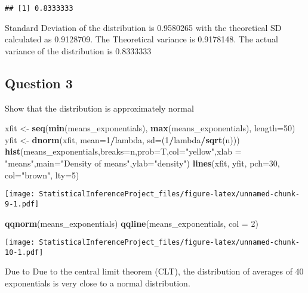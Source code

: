\documentclass[
]{article}
\newenvironment{Shaded}{\begin{snugshade}}{\end{snugshade}}
\newcommand{\AttributeTok}[1]{\textcolor[rgb]{0.13,0.29,0.53}{#1}}
\newcommand{\DecValTok}[1]{\textcolor[rgb]{0.00,0.00,0.81}{#1}}
\newcommand{\FunctionTok}[1]{\textcolor[rgb]{0.13,0.29,0.53}{\textbf{#1}}}
\newcommand{\NormalTok}[1]{#1}
\newcommand{\OtherTok}[1]{\textcolor[rgb]{0.56,0.35,0.01}{#1}}
\newcommand{\SpecialCharTok}[1]{\textcolor[rgb]{0.81,0.36,0.00}{\textbf{#1}}}
\newcommand{\StringTok}[1]{\textcolor[rgb]{0.31,0.60,0.02}{#1}}
\begin{document}
\begin{verbatim}
## [1] 0.8333333
\end{verbatim}

Standard Deviation of the distribution is 0.9580265 with the theoretical
SD calculated as 0.9128709. The Theoretical variance is 0.9178148. The
actual variance of the distribution is 0.8333333

\subsection{Question 3}\label{question-3}

Show that the distribution is approximately normal

\begin{Shaded}
\begin{Highlighting}[]
\NormalTok{xfit }\OtherTok{\textless{}{-}} \FunctionTok{seq}\NormalTok{(}\FunctionTok{min}\NormalTok{(means\_exponentials), }\FunctionTok{max}\NormalTok{(means\_exponentials), }\AttributeTok{length=}\DecValTok{50}\NormalTok{)}
\NormalTok{yfit }\OtherTok{\textless{}{-}} \FunctionTok{dnorm}\NormalTok{(xfit, }\AttributeTok{mean=}\DecValTok{1}\SpecialCharTok{/}\NormalTok{lambda, }\AttributeTok{sd=}\NormalTok{(}\DecValTok{1}\SpecialCharTok{/}\NormalTok{lambda}\SpecialCharTok{/}\FunctionTok{sqrt}\NormalTok{(n)))}
\FunctionTok{hist}\NormalTok{(means\_exponentials,}\AttributeTok{breaks=}\NormalTok{n,}\AttributeTok{prob=}\NormalTok{T,}\AttributeTok{col=}\StringTok{"yellow"}\NormalTok{,}\AttributeTok{xlab =} \StringTok{"means"}\NormalTok{,}\AttributeTok{main=}\StringTok{"Density of means"}\NormalTok{,}\AttributeTok{ylab=}\StringTok{"density"}\NormalTok{)}
\FunctionTok{lines}\NormalTok{(xfit, yfit, }\AttributeTok{pch=}\DecValTok{30}\NormalTok{, }\AttributeTok{col=}\StringTok{"brown"}\NormalTok{, }\AttributeTok{lty=}\DecValTok{5}\NormalTok{)}
\end{Highlighting}
\end{Shaded}

\texttt{[image: StatisticalInferenceProject\_files/figure-latex/unnamed-chunk-9-1.pdf]}

\begin{Shaded}
\begin{Highlighting}[]
\FunctionTok{qqnorm}\NormalTok{(means\_exponentials)}
\FunctionTok{qqline}\NormalTok{(means\_exponentials, }\AttributeTok{col =} \DecValTok{2}\NormalTok{)}
\end{Highlighting}
\end{Shaded}

\texttt{[image: StatisticalInferenceProject\_files/figure-latex/unnamed-chunk-10-1.pdf]}

Due to Due to the central limit theorem (CLT), the distribution of
averages of 40 exponentials is very close to a normal distribution.
\end{document}
